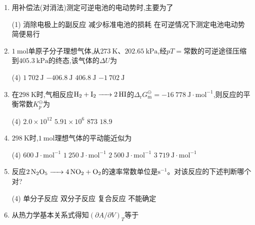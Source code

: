 \begin{enumerate}[label=\arabic*., itemsep=1.5ex]
    $\ce{Tl+ + e^- -> Tl(s)}$,\quad $E_1\ (\ce{Tl+ / Tl})=-0.34\ \mathrm{V}$

    $\ce{Tl^3+ + 3e^- -> Tl(s)}$,\quad $E_2\ (\ce{Tl^3+ / Tl})=0.72\ \mathrm{V}$

    则$\ce{Tl^3+ + 2e^- -> Tl+}$的$E_3$值为
    \begin{tasks}(4)
        \task $1.06\ \mathrm{V}$
        \task $0.38\ \mathrm{V}$
        \task $1.25\ \mathrm{V}$
        \task $0.83\ \mathrm{V}$
    \end{tasks}
    \item 用补偿法(对消法)测定可逆电池的电动势时,主要为了
    \begin{tasks}(1)
        \task 消除电极上的副反应
        \task 减少标准电池的损耗
        \task 在可逆情况下测定电池电动势
        \task 简便易行
    \end{tasks}
    \item $1\ \mathrm{mol}$单原子分子理想气体,从$273\ \mathrm{K}$、$202.65\ \mathrm{kPa}$,经$pT=$常数的可逆途径压缩到$405.3\ \mathrm{kPa}$的终态,该气体的$\Delta U$为
    \begin{tasks}(4)
        \task $1\ 702\ \mathrm{J}$
        \task $-406.8\ \mathrm{J}$
        \task $406.8\ \mathrm{J}$
        \task $-1\ 702\ \mathrm{J}$
    \end{tasks}
    \item 在$298\ \mathrm{K}$时,气相反应$\ce{H2 + I2 -> 2HI}$的$\Delta_\mathrm{r}G_\mathrm{m}^\ominus=-16\ 778\ \mathrm{J\cdot mol^{-1}}$,则反应的平衡常数$K_p^\ominus$为
    \begin{tasks}(4)
        \task $2.0\times10^{12}$
        \task $5.91\times10^{6}$
        \task $873$
        \task $18.9$
    \end{tasks}
    \item $298\ \mathrm{K}$时,$1\ \mathrm{mol}$理想气体的平动能近似为
    \begin{tasks}(4)
        \task $600\ \mathrm{J\cdot mol^{-1}}$
        \task $1\ 250\ \mathrm{J\cdot mol^{-1}}$
        \task $2\ 500\ \mathrm{J\cdot mol^{-1}}$
        \task $3\ 719\ \mathrm{J\cdot mol^{-1}}$
    \end{tasks}
    \item 反应$\ce{2N2O5 -> 4NO2 + O2}$的速率常数单位是$\mathrm{s^{-1}}$。对该反应的下述判断哪个对?
    \begin{tasks}(4)
        \task 单分子反应
        \task 双分子反应
        \task 复合反应
        \task 不能确定
    \end{tasks}
    \item 从热力学基本关系式得知$(\partial A/\partial V)_T$等于

\end{enumerate}

